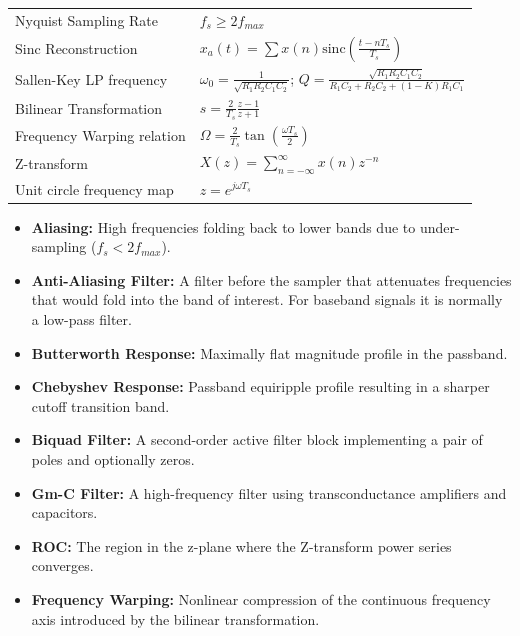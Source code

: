 \documentclass[12pt,a4paper]{article}
\renewcommand{\arraystretch}{1.45}
\begin{document}
\begin{tcolorbox}[formulabox, title={\textbf{Key Formulas and Transforms at a Glance}}]
\renewcommand{\arraystretch}{1.35}
\begin{tabularx}{\linewidth}{B{5.0cm} X}
Nyquist Sampling Rate & $f_s \ge 2 f_{max}$ \\[4pt]
Sinc Reconstruction & $x_a(t) = \sum x(n) \text{sinc}\left(\frac{t - nT_s}{T_s}\right)$ \\[4pt]
Sallen-Key LP frequency & $\omega_0 = \frac{1}{\sqrt{R_1 R_2 C_1 C_2}}$; \quad $Q = \frac{\sqrt{R_1 R_2 C_1 C_2}}{R_1 C_2 + R_2 C_2 + (1-K)R_1 C_1}$ \\[4pt]
Bilinear Transformation & $s = \frac{2}{T_s} \frac{z-1}{z+1}$ \\[4pt]
Frequency Warping relation & $\Omega = \frac{2}{T_s} \tan\left(\frac{\omega T_s}{2}\right)$ \\[4pt]
Z-transform & $X(z) = \sum_{n=-\infty}^{\infty} x(n) z^{-n}$ \\[4pt]
Unit circle frequency map & $z = e^{j\omega T_s}$ \\[4pt]
\end{tabularx}
\end{tcolorbox}

\begin{tcolorbox}[defbox, title={\textbf{One-Line Definitions}}]
\begin{itemize}[leftmargin=*, itemsep=2pt, topsep=0pt]
  \item \textbf{Aliasing:} High frequencies folding back to lower bands due to under-sampling ($f_s < 2f_{max}$).
  \item \textbf{Anti-Aliasing Filter:} A filter before the sampler that attenuates frequencies that would fold into the band of interest. For baseband signals it is normally a low-pass filter.
  \item \textbf{Butterworth Response:} Maximally flat magnitude profile in the passband.
  \item \textbf{Chebyshev Response:} Passband equiripple profile resulting in a sharper cutoff transition band.
  \item \textbf{Biquad Filter:} A second-order active filter block implementing a pair of poles and optionally zeros.
  \item \textbf{Gm-C Filter:} A high-frequency filter using transconductance amplifiers and capacitors.
  \item \textbf{ROC:} The region in the z-plane where the Z-transform power series converges.
  \item \textbf{Frequency Warping:} Nonlinear compression of the continuous frequency axis introduced by the bilinear transformation.
\end{itemize}
\end{tcolorbox}
\end{document}
